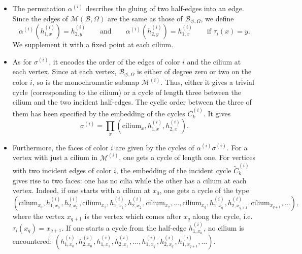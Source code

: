 \documentclass[aps,prd,10pt,notitlepage,nofootinbib,superscriptaddress,showkeys,showpacs]{revtex4-1}
\begin{document}
\begin{itemize}
\item The permutation $\alpha^{(i)}$ describes the gluing of two half-edges into an edge. Since the edges of ${\mathcal{M}}({\mathcal{B}}, \Omega)$ are the same as those of ${\mathcal{B}}_{\circlearrowleft, \Omega}$, we define 
\begin{equation}
\alpha^{(i)}(h^{(i)}_{1,x}) = h^{(i)}_{2,y} \qquad \text{and} \qquad \alpha^{(i)}(h^{(i)}_{2,y}) = h^{(i)}_{1,x} \qquad \text{if $\tau_i(x) = y$}.
\end{equation}
We supplement it with a fixed point at each cilium.
\item As for $\sigma^{(i)}$, it encodes the order of the edges of color $i$ and the cilium at each vertex. Since at each vertex, ${\mathcal{B}}_{\circlearrowleft, \Omega}$ is either of degree zero or two on the color $i$, so is the monochromatic submap ${\mathcal{M}}^{(i)}$. Thus, either it gives a trivial cycle (corresponding to the cilium) or a cycle of length three between the cilium and the two incident half-edges. The cyclic order between the three of them has been specified by the embedding of the cycles $C^{(i)}_k$. It gives
\begin{equation}
\sigma^{(i)} = \prod_x (\text{cilium}_x, h^{(i)}_{1,x}, h^{(i)}_{2,x}).
\end{equation}
\item Furthermore, the faces of color $i$ are given by the cycles of $\alpha^{(i)}\sigma^{(i)}$. For a vertex with just a cilium in ${\mathcal{M}}^{(i)}$, one gets a cycle of length one. For vertices with two incident edges of color $i$, the embedding of the incident cycle $\tilde{C}^{(i)}_k$ gives rise to two faces: one has no cilia while the other has a cilium at each vertex. Indeed, if one starts with a cilium at $x_0$, one gets a cycle of the type
\begin{equation} \label{CycleBrokenFaces}
(\text{cilium}_{x_0}, h^{(i)}_{1,x_0}, h^{(i)}_{2,x_1}, \text{cilium}_{x_1}, h^{(i)}_{1,x_1}, h^{(i)}_{2, x_2}, \text{cilium}_{x_2}, \dotsc, \text{cilium}_{x_q}, h^{(i)}_{1,x_q}, h^{(i)}_{2,x_{q+1}}, \text{cilium}_{x_{q+1}}, \dotsc ),
\end{equation}
where the vertex $x_{q+1}$ is the vertex which comes after $x_q$ along the cycle, i.e. $\tau_i(x_q) = x_{q+1}$. If one starts a cycle from the half-edge $h^{(i)}_{1,x_0}$, no cilium is encountered: $(h^{(i)}_{1,x_0}, h^{(i)}_{2,x_0}, h^{(i)}_{1,x_1}, h^{(i)}_{2,x_1}, \dotsc, h^{(i)}_{1,x_q}, h^{(i)}_{2,x_q}, h^{(i)}_{1,x_{q+1}}, \dotsc)$.
\end{itemize}
\end{document}
